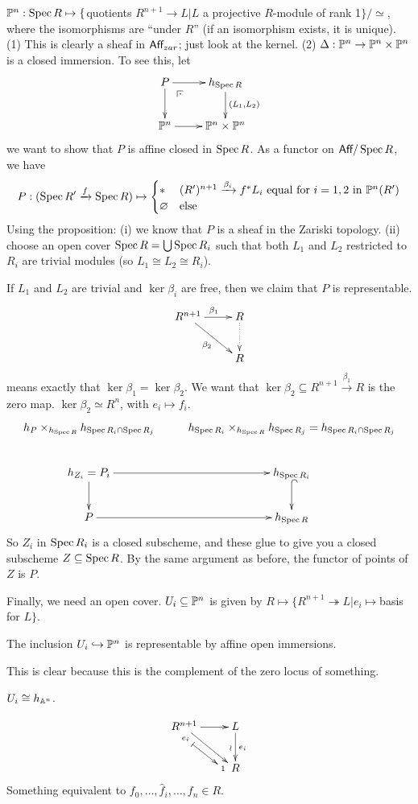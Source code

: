 \begin{example} 
  $\PP^n: \spec R\mapsto \{$quotients $R^{n+1}\to L| L$ a projective $R$-module of rank
  1$\}/\simeq$, where the isomorphisms are ``under $R$'' (if an isomorphism exists, it
  is unique). (1) This is clearly a sheaf in $\aff_{zar}$; just look at the kernel. (2)
  $\Delta:\PP^n\to \PP^n\times \PP^n$ is a closed immersion. To see this, let
  \[\xymatrix{
   P \ar@{}[dr]|(.25){\pb} \ar[r] \ar[d] & h_{\spec R}\ar[d]^{(L_1,L_2)}\\
   \PP^n \ar[r] & \PP^n\times \PP^n
  }\]
  we want to show that $P$ is affine closed in $\spec R$. As a functor on $\aff/\spec
  R$, we have
  \[P:(\spec R'\xrightarrow f \spec R) \mapsto \begin{cases}
    \ast & (R')^{n+1}\xrightarrow{\beta_i} f^* L_i \text{ equal for $i=1,2$ in }\PP^n(R')\\
    \varnothing & \text{else}
  \end{cases}
  \]
  Using the proposition: (i) we know that $P$ is a sheaf in the Zariski topology. (ii)
  choose an open cover $\spec R=\bigcup \spec R_i$ such that both $L_1$ and $L_2$
  restricted to $R_i$ are trivial modules (so $L_1\cong L_2\cong R_i$).

  If $L_1$ and $L_2$ are trivial and $\ker \beta_i$ are free, then we claim that $P$ is
  representable.
  \[\xymatrix{
   R^{n+1} \ar[r]^{\beta_1} \ar[dr]_{\beta_2} & R \ar@{.>}[d]\\ & R
  }\]
  means exactly that $\ker \beta_1=\ker \beta_2$. We want that $\ker \beta_2 \subseteq
  R^{n+1}\xrightarrow{\beta_1} R$ is the zero map. $\ker \beta_2\simeq R^n$, with
  $e_i\mapsto f_i$.
  \[\xymatrix{
   h_P\times_{h_{\spec R}} h_{\spec R_i \cap \spec R_j} & h_{\spec R_i}\times_{h_{\spec R}} h_{\spec R_j} = h_{\spec R_i\cap \spec R_j}  \\
   h_{Z_i}=P_i\ar[r] \ar[d] & h_{\spec R_i} \ar@{^(->}[d]\\
   P\ar[r] & h_{\spec R}
  }\]
  So $Z_i$ in $\spec R_i$ is a closed subscheme, and these glue to give you a closed
  subscheme $Z\subseteq \spec R$. By the same argument as before, the functor of points
  of $Z$ is $P$.

  Finally, we need an open cover. $U_i\subseteq \PP^n$ is given by $R\mapsto
  \{R^{n+1}\twoheadrightarrow L|e_i\mapsto $basis for $L\}$.
  \begin{claim}
    The inclusion $U_i\hookrightarrow \PP^n$ is representable by affine open immersions.
  \end{claim}
  This is clear because this is the complement of the zero locus of something.
  \begin{claim}
    $U_i\cong h_{\AA^n}$.
  \end{claim}
  \[\xymatrix{
   R^{n+1} \ar[r]\ar[dr]_<{e_i}="e"_>{1}="1" \ar@{|->} "e";"1" & L\ar[d]_{\wr}^{e_i}\\
   & R
  }\]
  Something equivalent to $f_0,\dots, \hat f_i,\dots, f_n\in R$.


\end{example}
